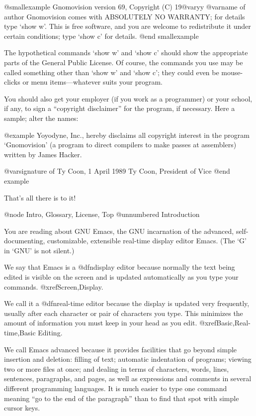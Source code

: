 @smallexample
Gnomovision version 69, Copyright (C) 19@var{yy} @var{name of author}
Gnomovision comes with ABSOLUTELY NO WARRANTY; for details type `show w'.
This is free software, and you are welcome to redistribute it
under certain conditions; type `show c' for details.
@end smallexample

The hypothetical commands `show w' and `show c' should show the
appropriate parts of the General Public License.  Of course, the
commands you use may be called something other than `show w' and `show
c'; they could even be mouse-clicks or menu items---whatever suits your
program.

You should also get your employer (if you work as a programmer) or your
school, if any, to sign a ``copyright disclaimer'' for the program, if
necessary.  Here a sample; alter the names:

@example
Yoyodyne, Inc., hereby disclaims all copyright interest in the
program `Gnomovision' (a program to direct compilers to make passes
at assemblers) written by James Hacker.

@var{signature of Ty Coon}, 1 April 1989
Ty Coon, President of Vice
@end example

That's all there is to it!

@node Intro, Glossary, License, Top
@unnumbered Introduction

  You are reading about GNU Emacs, the GNU incarnation of the advanced,
self-documenting, customizable, extensible real-time display editor Emacs.
(The `G' in `GNU' is not silent.)

  We say that Emacs is a @dfn{display} editor because normally the text
being edited is visible on the screen and is updated automatically as you
type your commands.  @xref{Screen,Display}.

  We call it a @dfn{real-time} editor because the display is updated very
frequently, usually after each character or pair of characters you
type.  This minimizes the amount of information you must keep in your
head as you edit.  @xref{Basic,Real-time,Basic Editing}.

  We call Emacs advanced because it provides facilities that go beyond
simple insertion and deletion: filling of text; automatic indentation of
programs; viewing two or more files at once; and dealing in terms of
characters, words, lines, sentences, paragraphs, and pages, as well as
expressions and comments in several different programming languages.  It is
much easier to type one command meaning ``go to the end of the paragraph''
than to find that spot with simple cursor keys.

